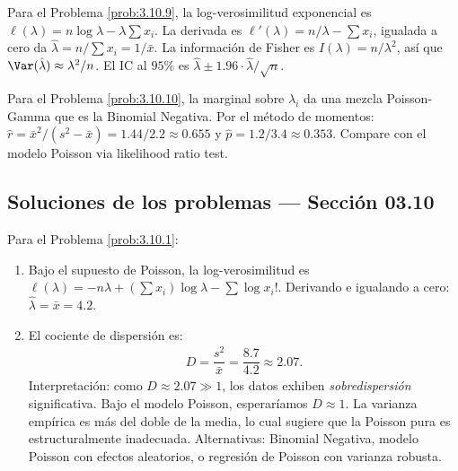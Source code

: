\begin{sugerencia}
	\label{sug:3.10.9}
	Para el Problema \ref{prob:3.10.9}, la log-verosimilitud exponencial es $\ell(\lambda) = n\log \lambda - \lambda \sum x_{i}$. La derivada es $\ell'(\lambda) = n/\lambda - \sum x_{i}$, igualada a cero da $\hat{\lambda} = n/\sum x_{i} = 1/\bar{x}$. La información de Fisher es $I(\lambda) = n/\lambda^{2}$, así que $\Var(\hat{\lambda}) \approx \lambda^{2}/n$. El IC al $95\%$ es $\hat{\lambda} \pm 1.96 \cdot \hat{\lambda}/\sqrt{n}$.
\end{sugerencia}

\begin{sugerencia}
	\label{sug:3.10.10}
	Para el Problema \ref{prob:3.10.10}, la marginal sobre $\lambda_{i}$ da una mezcla Poisson-Gamma que es la Binomial Negativa. Por el método de momentos: $\hat{r} = \bar{x}^{2}/(s^{2} - \bar{x}) = 1.44/2.2 \approx 0.655$ y $\hat{p} = 1.2/3.4 \approx 0.353$. Compare con el modelo Poisson via likelihood ratio test.
\end{sugerencia}

\subsection*{Soluciones de los problemas --- Sección 03.10}

\begin{solucion}
	\label{sol:3.10.1}
	Para el Problema \ref{prob:3.10.1}:
	\begin{enumerate}
		\item Bajo el supuesto de Poisson, la log-verosimilitud es $\ell(\lambda) = -n\lambda + (\sum x_{i})\log \lambda - \sum \log x_{i}!$. Derivando e igualando a cero: $\hat{\lambda} = \bar{x} = 4.2$.
		\item El cociente de dispersión es:
		\begin{align*}
			D = \dfrac{s^{2}}{\bar{x}} = \dfrac{8.7}{4.2} \approx 2.07.
		\end{align*}
		Interpretación: como $D \approx 2.07 \gg 1$, los datos exhiben \emph{sobredispersión} significativa. Bajo el modelo Poisson, esperaríamos $D \approx 1$. La varianza empírica es más del doble de la media, lo cual sugiere que la Poisson pura es estructuralmente inadecuada. Alternativas: Binomial Negativa, modelo Poisson con efectos aleatorios, o regresión de Poisson con varianza robusta.
	\end{enumerate}
\end{solucion}

